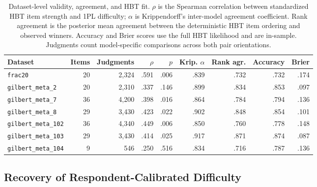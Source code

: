 \documentclass[11pt]{article}
\begin{document}
\begin{table}[t]
  \centering
  \small
  \setlength{\tabcolsep}{4.5pt}
  \begin{tabular}{lrrrrrrrr}
    \toprule
    Dataset & Items & Judgments & $\rho$ & $p$ & Krip. $\alpha$ & Rank agr. & Accuracy & Brier \\
    \midrule
    \texttt{frac20}             & 20 & 2,324 & .591 & .006 & .839 & .732 & .732 & .174 \\
    \texttt{gilbert\_meta\_2}   & 20 & 2,310 & .337 & .146 & .899 & .834 & .853 & .097 \\
    \texttt{gilbert\_meta\_7}   & 36 & 4,200 & .398 & .016 & .864 & .784 & .794 & .136 \\
    \texttt{gilbert\_meta\_8}   & 29 & 3,430 & .423 & .022 & .902 & .848 & .854 & .101 \\
    \texttt{gilbert\_meta\_102} & 36 & 4,340 & .449 & .006 & .850 & .760 & .778 & .148 \\
    \texttt{gilbert\_meta\_103} & 29 & 3,430 & .414 & .025 & .917 & .871 & .874 & .087 \\
    \texttt{gilbert\_meta\_104} &  9 &   546 & .250 & .516 & .834 & .716 & .787 & .136 \\
    \bottomrule
  \end{tabular}
  \caption{Dataset-level validity, agreement, and HBT fit. $\rho$ is the Spearman correlation between standardized HBT item strength and 1PL difficulty; $\alpha$ is Krippendorff's inter-model agreement coefficient. Rank agreement is the posterior mean agreement between the deterministic HBT item ordering and observed winners. Accuracy and Brier scores use the full HBT likelihood and are in-sample. Judgments count model-specific comparisons across both pair orientations.}
  \label{tab:dataset_summary}
\end{table}

\subsection{Recovery of Respondent-Calibrated Difficulty}
\end{document}
